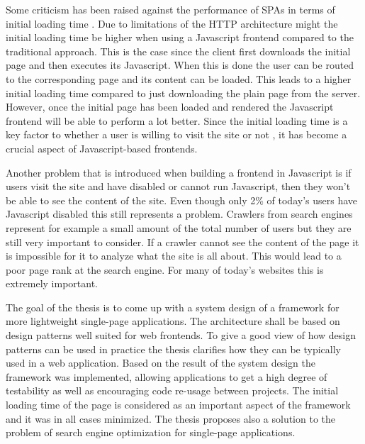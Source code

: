 Some criticism has been raised against the performance of SPAs in terms of initial loading time \cite{twitter_no_hashbang}. Due to limitations of the HTTP architecture might the initial loading time be higher when using a Javascript frontend compared to the traditional approach. This is the case since the client first downloads the initial page and then executes its Javascript. When this is done the user can be routed to the corresponding page and its content can be loaded. This leads to a higher initial loading time compared to just downloading the plain page from the server. However, once the initial page has been loaded and rendered the Javascript frontend will be able to perform a lot better. Since the initial loading time is a key factor to whether a user is willing to visit the site or not \cite{slow_not_pop}, it has become a crucial aspect of Javascript-based frontends.

Another problem that is introduced when building a frontend in Javascript is if users visit the site and have disabled or cannot run Javascript, then they won't be able to see the content of the site. Even though only 2\% of today's users have Javascript disabled \cite{js_enabled_stats} this still represents a problem. Crawlers from search engines represent for example a small amount of the total number of users but they are still very important to consider. If a crawler cannot see the content of the page it is impossible for it to analyze what the site is all about. This would lead to a poor page rank at the search engine. For many of today's websites this is extremely important.


The goal of the thesis is to come up with a system design of a framework for more lightweight single-page applications. The architecture shall be based on design patterns well suited for web frontends. To give a good view of how design patterns can be used in practice the thesis clarifies how they can be typically used in a web application. Based on the result of the system design the framework was implemented, allowing applications to get a high degree of testability as well as encouraging code re-usage between projects. The initial loading time of the page is considered as an important aspect of the framework and it was in all cases minimized. The thesis proposes also a solution to the problem of search engine optimization for single-page applications.

